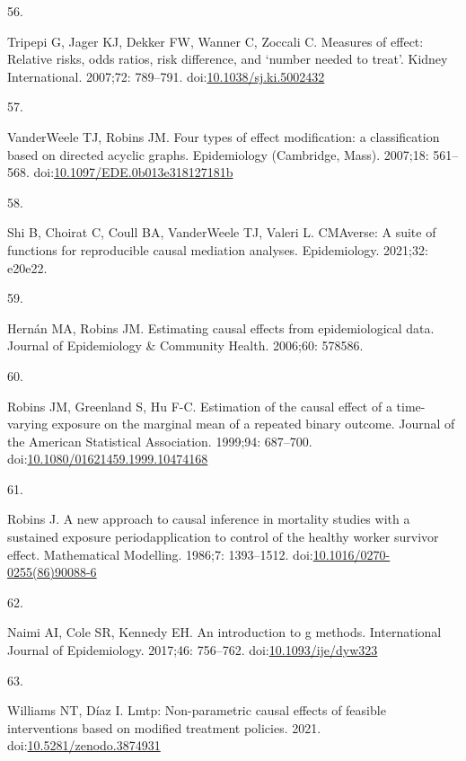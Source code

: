 \documentclass[
  singlecolumn]{article}
\newlength{\cslhangindent}
\newlength{\csllabelwidth}
\newlength{\cslentryspacingunit} %
\newenvironment{CSLReferences}[2] %
 {%
  \setlength{\parindent}{0pt}
  \ifodd #1
  \let\oldpar\par
  \def\par{\hangindent=\cslhangindent\oldpar}
  \fi
  \setlength{\parskip}{#2\cslentryspacingunit}
 }%
 {}
\newcommand{\CSLLeftMargin}[1]{\parbox[t]{\csllabelwidth}{#1}}
\newcommand{\CSLRightInline}[1]{\parbox[t]{\linewidth - \csllabelwidth}{#1}\break}
\begin{document}
\begin{CSLReferences}{0}{0}
\leavevmode{}%
\CSLLeftMargin{56. }%
\CSLRightInline{Tripepi G, Jager KJ, Dekker FW, Wanner C, Zoccali C.
Measures of effect: Relative risks, odds ratios, risk difference, and
{`}number needed to treat{'}. Kidney International. 2007;72: 789--791.
doi:\href{https://doi.org/10.1038/sj.ki.5002432}{10.1038/sj.ki.5002432}}

\leavevmode{}%
\CSLLeftMargin{57. }%
\CSLRightInline{VanderWeele TJ, Robins JM. Four types of effect
modification: a classification based on directed acyclic graphs.
Epidemiology (Cambridge, Mass). 2007;18: 561--568.
doi:\href{https://doi.org/10.1097/EDE.0b013e318127181b}{10.1097/EDE.0b013e318127181b}}

\leavevmode{}%
\CSLLeftMargin{58. }%
\CSLRightInline{Shi B, Choirat C, Coull BA, VanderWeele TJ, Valeri L.
CMAverse: A suite of functions for reproducible causal mediation
analyses. Epidemiology. 2021;32: e20e22. }

\leavevmode{}%
\CSLLeftMargin{59. }%
\CSLRightInline{Hernán MA, Robins JM. Estimating causal effects from
epidemiological data. Journal of Epidemiology \& Community Health.
2006;60: 578586. }

\leavevmode{}%
\CSLLeftMargin{60. }%
\CSLRightInline{Robins JM, Greenland S, Hu F-C. Estimation of the causal
effect of a time-varying exposure on the marginal mean of a repeated
binary outcome. Journal of the American Statistical Association.
1999;94: 687--700.
doi:\href{https://doi.org/10.1080/01621459.1999.10474168}{10.1080/01621459.1999.10474168}}

\leavevmode{}%
\CSLLeftMargin{61. }%
\CSLRightInline{Robins J. A new approach to causal inference in
mortality studies with a sustained exposure
period{\textemdash}application to control of the healthy worker survivor
effect. Mathematical Modelling. 1986;7: 1393--1512.
doi:\href{https://doi.org/10.1016/0270-0255(86)90088-6}{10.1016/0270-0255(86)90088-6}}

\leavevmode{}%
\CSLLeftMargin{62. }%
\CSLRightInline{Naimi AI, Cole SR, Kennedy EH. An introduction to g
methods. International Journal of Epidemiology. 2017;46: 756--762.
doi:\href{https://doi.org/10.1093/ije/dyw323}{10.1093/ije/dyw323}}

\leavevmode{}%
\CSLLeftMargin{63. }%
\CSLRightInline{Williams NT, Díaz I. Lmtp: Non-parametric causal effects
of feasible interventions based on modified treatment policies. 2021.
doi:\href{https://doi.org/10.5281/zenodo.3874931}{10.5281/zenodo.3874931}}


\end{CSLReferences}
\end{document}
